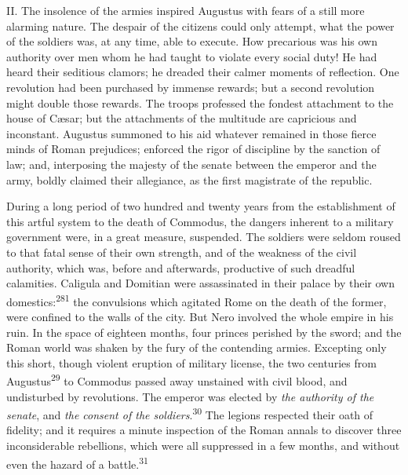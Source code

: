 
II. The insolence of the armies inspired Augustus with fears of a
still more alarming nature. The despair of the citizens could
only attempt, what the power of the soldiers was, at any time,
able to execute. How precarious was his own authority over men
whom he had taught to violate every social duty! He had heard
their seditious clamors; he dreaded their calmer moments of
reflection. One revolution had been purchased by immense rewards;
but a second revolution might double those rewards. The troops
professed the fondest attachment to the house of Cæsar; but the
attachments of the multitude are capricious and inconstant.
Augustus summoned to his aid whatever remained in those fierce
minds of Roman prejudices; enforced the rigor of discipline by
the sanction of law; and, interposing the majesty of the senate
between the emperor and the army, boldly claimed their
allegiance, as the first magistrate of the republic.

During a long period of two hundred and twenty years from the
establishment of this artful system to the death of Commodus, the
dangers inherent to a military government were, in a great
measure, suspended. The soldiers were seldom roused to that fatal
sense of their own strength, and of the weakness of the civil
authority, which was, before and afterwards, productive of such
dreadful calamities. Caligula and Domitian were assassinated in
their palace by their own domestics:\textsuperscript{281} the convulsions which
agitated Rome on the death of the former, were confined to the
walls of the city. But Nero involved the whole empire in his
ruin. In the space of eighteen months, four princes perished by
the sword; and the Roman world was shaken by the fury of the
contending armies. Excepting only this short, though violent
eruption of military license, the two centuries from Augustus\textsuperscript{29}
to Commodus passed away unstained with civil blood, and
undisturbed by revolutions. The emperor was elected by \textit{the
authority of the senate}, and \textit{the consent of the soldiers}.\textsuperscript{30}
The legions respected their oath of fidelity; and it requires a
minute inspection of the Roman annals to discover three
inconsiderable rebellions, which were all suppressed in a few
months, and without even the hazard of a battle.\textsuperscript{31}


